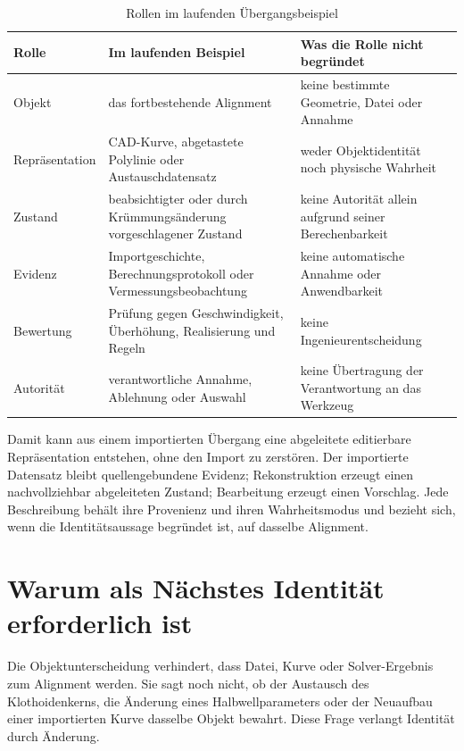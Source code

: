 \begin{table}[htbp]
\centering
\small
\caption{Rollen im laufenden Übergangsbeispiel}
\label{tab:meaning-roles}
\begin{tabular}{@{}p{}p{}p{}@{}}
\toprule
Rolle & Im laufenden Beispiel & Was die Rolle nicht begründet \\
\midrule
Objekt & das fortbestehende Alignment & keine bestimmte Geometrie, Datei oder Annahme \\
Repräsentation & CAD-Kurve, abgetastete Polylinie oder Austauschdatensatz & weder Objektidentität noch physische Wahrheit \\
Zustand & beabsichtigter oder durch Krümmungsänderung vorgeschlagener Zustand & keine Autorität allein aufgrund seiner Berechenbarkeit \\
Evidenz & Importgeschichte, Berechnungsprotokoll oder Vermessungsbeobachtung & keine automatische Annahme oder Anwendbarkeit \\
Bewertung & Prüfung gegen Geschwindigkeit, Überhöhung, Realisierung und Regeln & keine Ingenieurentscheidung \\
Autorität & verantwortliche Annahme, Ablehnung oder Auswahl & keine Übertragung der Verantwortung an das Werkzeug \\
\bottomrule
\end{tabular}
\end{table}

Damit kann aus einem importierten Übergang eine abgeleitete editierbare
Repräsentation entstehen, ohne den Import zu zerstören. Der importierte
Datensatz bleibt quellengebundene Evidenz; Rekonstruktion erzeugt einen
nachvollziehbar abgeleiteten Zustand; Bearbeitung erzeugt einen Vorschlag. Jede
Beschreibung behält ihre Provenienz und ihren Wahrheitsmodus und bezieht sich,
wenn die Identitätsaussage begründet ist, auf dasselbe Alignment.

\section{Warum als Nächstes Identität erforderlich ist}

Die Objektunterscheidung verhindert, dass Datei, Kurve oder Solver-Ergebnis zum
Alignment werden. Sie sagt noch nicht, ob der Austausch des Klothoidenkerns,
die Änderung eines Halbwellparameters oder der Neuaufbau einer importierten
Kurve dasselbe Objekt bewahrt. Diese Frage verlangt Identität durch Änderung.
